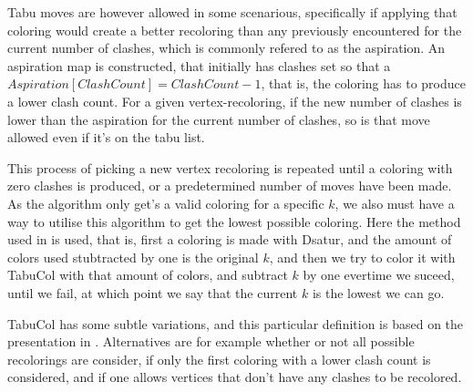 \documentclass{amsart}
\begin{document}
Tabu moves are however allowed in some scenarious, specifically if applying that
coloring would create a better recoloring than any previously encountered for
the current number of clashes, which is commonly refered to as the aspiration.
An aspiration map is constructed, that initially has clashes set so that a 
$Aspiration[ClashCount] = ClashCount-1$, that is, the coloring has to produce a
lower clash count. For a given vertex-recoloring, if the new number of clashes
is lower than the aspiration for the current number of clashes, so is that move
allowed even if it's on the tabu list.

This process of picking a new vertex recoloring is repeated until a coloring
with zero clashes is produced, or a predetermined number of moves have been
made. As the algorithm only get's a valid coloring for a specific $k$, we also
must have a way to utilise this algorithm to get the lowest possible coloring.
Here the method used in \cite{Constructive} is used, that is, first a coloring is made
with Dsatur, and the amount of colors used stubtracted by one is the original
$k$, and then we try to color it with TabuCol with that amount of colors, and
subtract $k$ by one evertime we suceed, until we fail, at which point we say
that the current $k$ is the lowest we can go.

TabuCol has some subtle variations, and this particular definition is based on
the presentation in \cite{1990}. Alternatives are for example whether or not all
possible recolorings are consider, if only the first coloring with a lower clash
count is considered, and if one allows vertices that don't have any clashes to
be recolored.
\end{document}
